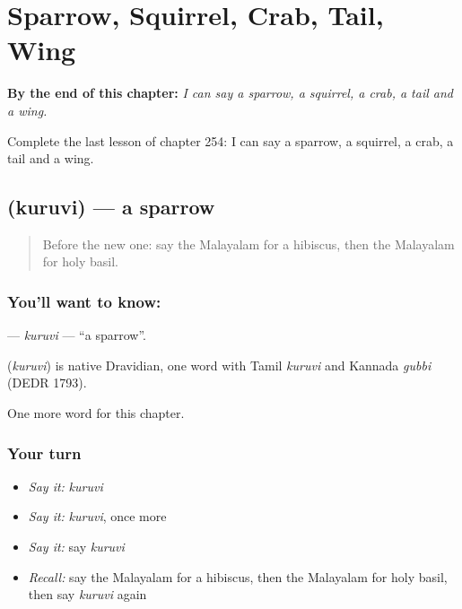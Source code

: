 
\chapter{Sparrow, Squirrel, Crab, Tail, Wing}
\label{ch:ml-sparrow-squirrel-crab-tail-wing}

\begin{chapteropening}
\textbf{By the end of this chapter:} \emph{I can say a sparrow, a squirrel, a crab, a tail and a wing.}

Complete the last lesson of chapter 254: I can say a sparrow, a squirrel, a crab, a tail and a wing.
\end{chapteropening}

\section[\texorpdfstring{\ml{കുരുവി} (kuruvi)}{കുരുവി (kuruvi)}]{ (kuruvi) — a sparrow}

\label{lesson:ML-C254-kuruvi}



\begin{quote}
Before the new one: say the Malayalam for a hibiscus, then the Malayalam for holy basil.
\end{quote}

\subsection*{You'll want to know: }
\textbf{} — \emph{kuruvi} — \textquotedblleft{}a sparrow\textquotedblright{}.

\begin{cousinweb}
\textbf{} (\emph{kuruvi}) is native Dravidian, one word with Tamil \emph{kuruvi} and Kannada \emph{gubbi} (DEDR 1793).
\end{cousinweb}

\begin{grammarlens}[title={What you've built}]
One more word for this chapter.
\end{grammarlens}

\subsection*{Your turn}
\begin{itemize}
\raggedright
  \item \emph{Say it:} \emph{kuruvi}
  \item \emph{Say it:} \emph{kuruvi}, once more
  \item \emph{Say it:} say \emph{kuruvi}
  \item \emph{Recall:} say the Malayalam for a hibiscus, then the Malayalam for holy basil, then say \emph{kuruvi} again
\end{itemize}

